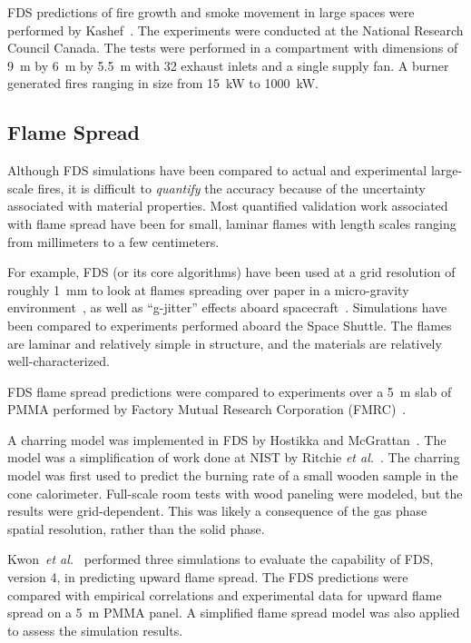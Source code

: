 FDS predictions of fire growth and smoke movement in large spaces were performed by Kashef~\cite{Kashef:1}. The experiments were conducted at the National Research Council Canada. The tests were performed in a compartment with dimensions of 9~m by 6~m by 5.5~m with 32 exhaust inlets and a single supply fan. A burner generated fires ranging in size from 15~kW to 1000~kW.


\subsection{Flame Spread}
\label{flame spread}

Although FDS simulations have been compared to actual and experimental large-scale fires, it is difficult to {\em quantify} the accuracy because of the uncertainty associated with material properties. Most quantified validation work associated with flame spread have been for small, laminar flames with length scales ranging from millimeters to a few centimeters.

For example, FDS (or its core algorithms) have been used at a grid resolution of roughly 1~mm to look at flames spreading over paper in a micro-gravity environment~\cite{McGrattan:C&F1996,Kashiwagi:CS1996,Mell:CS98,Mell:CS00,Prasad:CS2002,Nakamura:C&F2002}, as well as ``g-jitter'' effects aboard spacecraft~\cite{Mell:g-jitter}. Simulations have been compared to experiments performed aboard the Space Shuttle. The flames are laminar and relatively simple in structure, and the materials are relatively well-characterized.

FDS flame spread predictions were compared to experiments over a 5~m slab of PMMA performed by Factory Mutual Research Corporation (FMRC)~\cite{Ma:2,Ma:3}.

A  charring model  was  implemented in  FDS  by Hostikka  and McGrattan~\cite{Hostikka:2}. The model was a simplification of work done at NIST by Ritchie {\em et al.}~\cite{Ritchie:1}. The charring model was first used to predict the burning rate of a small wooden sample in the cone calorimeter. Full-scale room tests with wood paneling were modeled, but the results were grid-dependent. This was likely a consequence of the gas phase spatial resolution, rather than the solid phase. 

Kwon~{\em et al.}~\cite{Kwon:Fire_Technology_2007} performed three simulations to evaluate the capability of FDS, version 4, in predicting upward flame spread. The FDS predictions were compared with empirical correlations and experimental data for upward flame spread on a 5~m PMMA panel. A simplified flame spread model was also applied to assess the simulation results.

